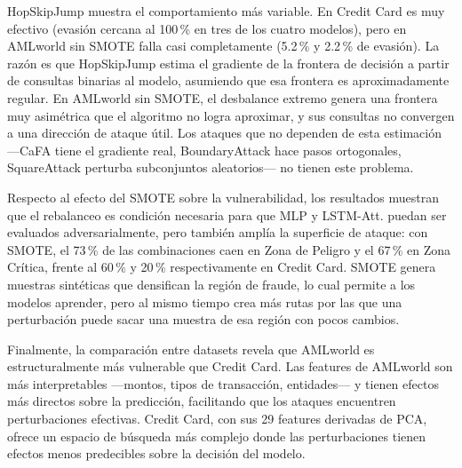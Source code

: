 HopSkipJump muestra el comportamiento más variable. En Credit Card es muy efectivo (evasión cercana al 100\,\% en tres de los cuatro modelos), pero en AMLworld sin SMOTE falla casi completamente (5.2\,\% y 2.2\,\% de evasión). La razón es que HopSkipJump estima el gradiente de la frontera de decisión a partir de consultas binarias al modelo, asumiendo que esa frontera es aproximadamente regular. En AMLworld sin SMOTE, el desbalance extremo genera una frontera muy asimétrica que el algoritmo no logra aproximar, y sus consultas no convergen a una dirección de ataque útil. Los ataques que no dependen de esta estimación —CaFA tiene el gradiente real, BoundaryAttack hace pasos ortogonales, SquareAttack perturba subconjuntos aleatorios— no tienen este problema.

Respecto al efecto del SMOTE sobre la vulnerabilidad, los resultados muestran que el rebalanceo es condición necesaria para que MLP y LSTM-Att. puedan ser evaluados adversarialmente, pero también amplía la superficie de ataque: con SMOTE, el 73\,\% de las combinaciones caen en Zona de Peligro y el 67\,\% en Zona Crítica, frente al 60\,\% y 20\,\% respectivamente en Credit Card. SMOTE genera muestras sintéticas que densifican la región de fraude, lo cual permite a los modelos aprender, pero al mismo tiempo crea más rutas por las que una perturbación puede sacar una muestra de esa región con pocos cambios.

Finalmente, la comparación entre datasets revela que AMLworld es estructuralmente más vulnerable que Credit Card. Las features de AMLworld son más interpretables —montos, tipos de transacción, entidades— y tienen efectos más directos sobre la predicción, facilitando que los ataques encuentren perturbaciones efectivas. Credit Card, con sus 29 features derivadas de PCA, ofrece un espacio de búsqueda más complejo donde las perturbaciones tienen efectos menos predecibles sobre la decisión del modelo.
